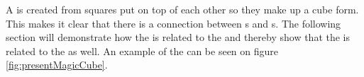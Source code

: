 \begin{comment}
The proof of this formula is quite straightforward. As table \ref{tab:magicSquareOrder3} illustrates, a \msquare{} of the order 3 contains the numbers from 1 to 9.

The sum of the numbers of a row in a \msquare{} is equal to the magic constant. If the magic constant is multiplied by the order $n$ it would be equal to the sum of all the integers, since each number only occurs once in a \msquare{}.

The equation \ref{proof:magicConstant1} can be rewritten into the equation \ref{proof:magicConstant2}(See proof of the right hand side transcription in appendix X).

\begin{align}
\label{proof:magicConstant1}
	n \cdot M \left( n \right) = \sum ^{n^2}_{i = 1} i = 1 + \cdots + n^2
\end{align}
\begin{align}
\label{proof:magicConstant2}
	n \cdot M \left( n \right) = \frac{n^2 \cdot \left( n^2 + 1 \right)}{2} \\
\label{proof:magicConstant3}
	M \left( n \right) = \frac{n \cdot \left( n^2 + 1 \right)}{2} 
\end{align}

The equation \ref{proof:magicConstant3} shows the function which gives the magic constant for a \msquare{} of the order $n$.
\end{comment}

A \mcube{} is created from squares put on top of each other so they make up a cube form. 
This makes it clear that there is a connection between \msquare{}s and \mcube{}s.
The following section will demonstrate how the \mcube{} is related to the \rubik{} and thereby show that the \msquare{} is related to the \rubik{} as well.
An example of the \mcube{} can be seen on figure \ref{fig:presentMagicCube}.